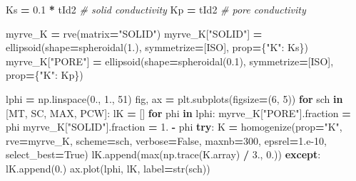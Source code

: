 \documentclass[
  a4paper,
  numbers=noendperiod,
  DIV=12]{scrreprt}
\newenvironment{Shaded}{\begin{snugshade}}{\end{snugshade}}
\newcommand{\BuiltInTok}[1]{#1}
\newcommand{\CommentTok}[1]{\textcolor[rgb]{0.56,0.35,0.01}{\textit{#1}}}
\newcommand{\ControlFlowTok}[1]{\textcolor[rgb]{0.13,0.29,0.53}{\textbf{#1}}}
\newcommand{\DecValTok}[1]{\textcolor[rgb]{0.00,0.00,0.81}{#1}}
\newcommand{\FloatTok}[1]{\textcolor[rgb]{0.00,0.00,0.81}{#1}}
\newcommand{\KeywordTok}[1]{\textcolor[rgb]{0.13,0.29,0.53}{\textbf{#1}}}
\newcommand{\NormalTok}[1]{#1}
\newcommand{\OperatorTok}[1]{\textcolor[rgb]{0.81,0.36,0.00}{\textbf{#1}}}
\newcommand{\StringTok}[1]{\textcolor[rgb]{0.31,0.60,0.02}{#1}}
\newcommand{\VariableTok}[1]{\textcolor[rgb]{0.00,0.00,0.00}{#1}}
\begin{document}
\begin{Shaded}
\begin{Highlighting}[]
\NormalTok{Ks }\OperatorTok{=} \FloatTok{0.1} \OperatorTok{*}\NormalTok{ tId2    }\CommentTok{\# solid conductivity}
\NormalTok{Kp }\OperatorTok{=}\NormalTok{ tId2           }\CommentTok{\# pore conductivity}

\NormalTok{myrve\_K }\OperatorTok{=}\NormalTok{ rve(matrix}\OperatorTok{=}\StringTok{"SOLID"}\NormalTok{)}
\NormalTok{myrve\_K[}\StringTok{"SOLID"}\NormalTok{] }\OperatorTok{=}\NormalTok{ ellipsoid(shape}\OperatorTok{=}\NormalTok{spheroidal(}\FloatTok{1.}\NormalTok{), symmetrize}\OperatorTok{=}\NormalTok{[ISO],}
\NormalTok{                             prop}\OperatorTok{=}\NormalTok{\{}\StringTok{"K"}\NormalTok{: Ks\})}
\NormalTok{myrve\_K[}\StringTok{"PORE"}\NormalTok{] }\OperatorTok{=}\NormalTok{ ellipsoid(shape}\OperatorTok{=}\NormalTok{spheroidal(}\FloatTok{0.1}\NormalTok{), symmetrize}\OperatorTok{=}\NormalTok{[ISO],}
\NormalTok{                            prop}\OperatorTok{=}\NormalTok{\{}\StringTok{"K"}\NormalTok{: Kp\})}

\NormalTok{lphi }\OperatorTok{=}\NormalTok{ np.linspace(}\FloatTok{0.}\NormalTok{, }\FloatTok{1.}\NormalTok{, }\DecValTok{51}\NormalTok{)}
\NormalTok{fig, ax }\OperatorTok{=}\NormalTok{ plt.subplots(figsize}\OperatorTok{=}\NormalTok{(}\DecValTok{6}\NormalTok{, }\DecValTok{5}\NormalTok{))}
\ControlFlowTok{for}\NormalTok{ sch }\KeywordTok{in}\NormalTok{ [MT, SC, MAX, PCW]:}
\NormalTok{    lK }\OperatorTok{=}\NormalTok{ []}
    \ControlFlowTok{for}\NormalTok{ phi }\KeywordTok{in}\NormalTok{ lphi:}
\NormalTok{        myrve\_K[}\StringTok{"PORE"}\NormalTok{].fraction }\OperatorTok{=}\NormalTok{ phi}
\NormalTok{        myrve\_K[}\StringTok{"SOLID"}\NormalTok{].fraction }\OperatorTok{=} \FloatTok{1.} \OperatorTok{{-}}\NormalTok{ phi}
        \ControlFlowTok{try}\NormalTok{:}
\NormalTok{            K }\OperatorTok{=}\NormalTok{ homogenize(prop}\OperatorTok{=}\StringTok{"K"}\NormalTok{, rve}\OperatorTok{=}\NormalTok{myrve\_K, scheme}\OperatorTok{=}\NormalTok{sch,}
\NormalTok{                           verbose}\OperatorTok{=}\VariableTok{False}\NormalTok{, maxnb}\OperatorTok{=}\DecValTok{300}\NormalTok{, epsrel}\OperatorTok{=}\FloatTok{1.e{-}10}\NormalTok{,}
\NormalTok{                           select\_best}\OperatorTok{=}\VariableTok{True}\NormalTok{)}
\NormalTok{            lK.append(}\BuiltInTok{max}\NormalTok{(np.trace(K.array) }\OperatorTok{/} \FloatTok{3.}\NormalTok{, }\FloatTok{0.}\NormalTok{))}
        \ControlFlowTok{except}\NormalTok{:}
\NormalTok{            lK.append(}\FloatTok{0.}\NormalTok{)}
\NormalTok{    ax.plot(lphi, lK, label}\OperatorTok{=}\BuiltInTok{str}\NormalTok{(sch))}


\end{Highlighting}
\end{Shaded}
\end{document}
